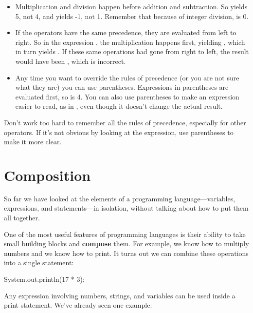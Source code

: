 \begin{itemize}

\item Multiplication and division happen before addition and subtraction.
So  yields 5, not 4, and  yields -1, not 1.
Remember that because of integer division,  is 0.

\item If the operators have the same precedence, they are evaluated from left to right.
So in the expression , the multiplication happens first, yielding , which in turn yields .
If these same operations had gone from right to left, the result would have been , which is incorrect.

\item Any time you want to override the rules of precedence (or you are not sure what they are) you can use parentheses.
Expressions in parentheses are evaluated first, so  is 4.
You can also use parentheses to make an expression easier to read, as in , even though it doesn't change the actual result.

\end{itemize}

Don't work too hard to remember all the rules of precedence, especially for other operators.
If it's not obvious by looking at the expression, use parentheses to make it more clear.


\section{Composition}


So far we have looked at the elements of a programming language---variables, expressions, and statements---in isolation, without talking about how to put them all together.

One of the most useful features of programming languages is their ability to take small building blocks and {\bf compose} them.
For example, we know how to multiply numbers and we know how to print.
It turns out we can combine these operations into a single statement:

\begin{code}
    System.out.println(17 * 3);
\end{code}

Any expression involving numbers, strings, and variables can be used inside a print statement.
We've already seen one example:

